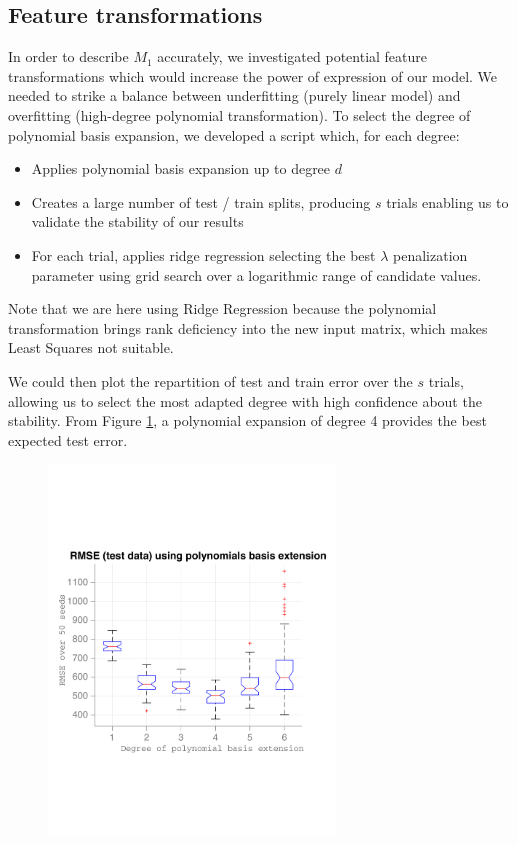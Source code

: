 \documentclass{article} %
\begin{document}
  \subsection{Feature transformations}
  In order to describe $M_1$ accurately, we investigated potential feature transformations which would increase the power of expression of our model. We needed to strike a balance between underfitting (purely linear model) and overfitting (high-degree polynomial transformation). To select the degree of polynomial basis expansion, we developed a script which, for each degree:
  \begin{itemize}
    \item Applies polynomial basis expansion up to degree $d$
    \item Creates a large number of test / train splits, producing $s$ trials enabling us to validate the stability of our results
    \item For each trial, applies ridge regression selecting the best $\lambda$ penalization parameter using grid search over a logarithmic range of candidate values. 
  \end{itemize}
  
  Note that we are here using Ridge Regression because the polynomial transformation brings rank deficiency into the new input matrix, which makes Least Squares not suitable.

  We could then plot the repartition of test and train error over the $s$ trials, allowing us to select the most adapted degree with high confidence about the stability. From Figure \ref{fig:basisExpansionTestError}, a polynomial expansion of degree 4 provides the best expected test error.

  \begin{figure}[h]
    \center
    \includegraphics[width=3in]{figures/regression/basis-extension-test-error.pdf}
    \caption{}
    \label{fig:basisExpansionTestError}
  \end{figure}
\end{document}
